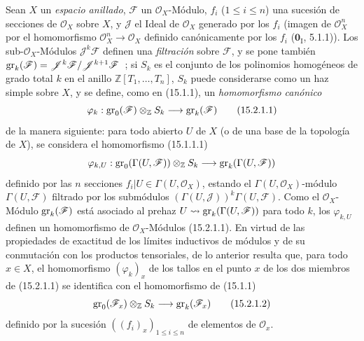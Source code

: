 \begin{env}[15.2.1]
\label{0.15.2.1-fr}
Sean $X$ un \emph{espacio anillado}, $\mathscr{F}$ un $\mathcal{O}_X$-Módulo,
$f_i$ ($1\leq i\leq n$) una sucesión de secciones de $\mathcal{O}_X$ sobre
$X$, y $\mathscr{J}$ el Ideal de $\mathcal{O}_X$ generado por los $f_i$
(imagen de $\mathcal{O}_X^n$ por el homomorfismo
$\mathcal{O}_X^n\to\mathcal{O}_X$ definido canónicamente por los $f_i$
($\mathbf{0}_{\mathrm I}$, 5.1.1)). Los sub-$\mathcal{O}_X$-Módulos
$\mathscr{J}^k\mathscr{F}$ definen una \emph{filtración} sobre $\mathscr{F}$, y
se pone también
$\operatorname{gr}_k(\mathscr{F})=\mathscr{J}^k\mathscr{F}/\mathscr{J}^{k+1}\mathscr{F}$~;
si $S_k$ es el conjunto de los polinomios homogéneos de grado total $k$ en
el anillo $\mathbb{Z}[T_1,\ldots,T_n]$, $S_k$ puede considerarse como un
haz simple sobre $X$, y se define, como en (15.1.1), un \emph{homomorfismo
canónico}
\[
\label{0.15.2.1.1-fr}
  \varphi_k:\operatorname{gr}_0(\mathscr{F})\otimes_{\mathbb Z}S_k
  \longrightarrow\operatorname{gr}_k(\mathscr{F})
\tag{15.2.1.1}
\]
de la manera siguiente: para todo abierto $U$ de $X$ (o de una base de la
topología de $X$), se considera el homomorfismo (15.1.1.1)
\[
  \varphi_{k,U}:\operatorname{gr}_0(\Gamma(U,\mathscr{F}))\otimes_{\mathbb Z}S_k
  \longrightarrow\operatorname{gr}_k(\Gamma(U,\mathscr{F}))
\]
definido por las $n$ secciones $f_i|U\in\Gamma(U,\mathcal{O}_X)$, estando el
$\Gamma(U,\mathcal{O}_X)$-módulo $\Gamma(U,\mathscr{F})$ filtrado por los
submódulos $(\Gamma(U,\mathscr{J}))^k\Gamma(U,\mathscr{F})$. Como el
$\mathcal{O}_X$-Módulo $\operatorname{gr}_k(\mathscr{F})$ está asociado al prehaz
$U\leadsto\operatorname{gr}_k(\Gamma(U,\mathscr{F}))$ para todo $k$, los $\varphi_{k,U}$
definen un homomorfismo de $\mathcal{O}_X$-Módulos (15.2.1.1). En virtud
de las propiedades de exactitud de los límites inductivos de módulos y de su
conmutación con los productos tensoriales, de lo anterior resulta que, para
todo $x\in X$, el homomorfismo $(\varphi_k)_x$ de los tallos en el punto $x$
de los dos miembros de (15.2.1.1) se identifica con el homomorfismo de (15.1.1)
\[
\label{0.15.2.1.2-fr}
  \operatorname{gr}_0(\mathscr{F}_x)\otimes_{\mathbb Z}S_k
  \longrightarrow\operatorname{gr}_k(\mathscr{F}_x)
\tag{15.2.1.2}
\]
definido por la sucesión $((f_i)_x)_{1\leq i\leq n}$ de elementos de
$\mathcal{O}_x$.
\end{env}

